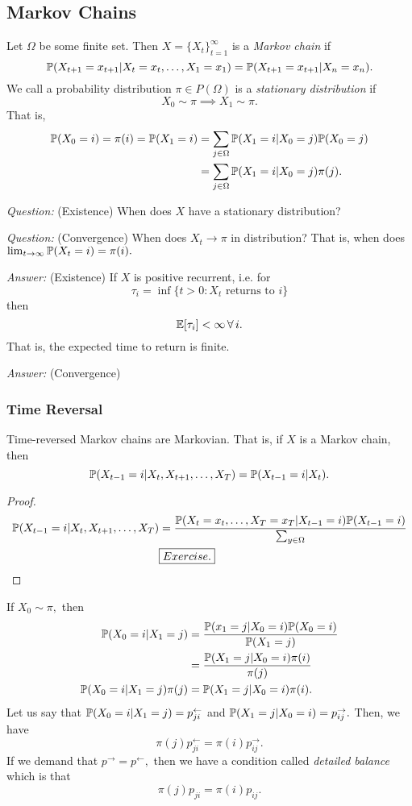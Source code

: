 \documentclass{chaistyle}
\begin{document}
\subsection*{Markov Chains}
Let \(\Omega\) be some finite set. Then \(X=\{X_t\}_{t=1}^\infty\) is a \emph{Markov chain} if  \[\P(X_{t+1}=x_{t+1}|X_t=x_t,\dots,X_1=x_1)=\P(X_{t+1}=x_{t+1}|X_n=x_n).\] We call a probability distribution \(\pi\in P(\Omega)\) is a \emph{stationary distribution} if \[X_0\sim\pi\implies X_1\sim\pi.\] That is, \begin{align*}
    \P(X_0=i)=\pi(i)=\P(X_1=i)&=\sum_{j\in\Omega} \P(X_1=i|X_0=j)\P(X_0=j) \\ 
    &= \sum_{j\in\Omega} \P(X_1=i|X_0=j)\pi(j).
\end{align*}

\emph{Question:} (Existence) When does \(X\) have a stationary distribution?

\emph{Question:} (Convergence) When does \(X_t\to\pi\) in distribution? That is, when does \(\lim_{t \to \infty} \P(X_t=i)=\pi(i).\)

\emph{Answer:} (Existence) If \(X\) is positive recurrent, i.e. for \[\tau_i=\inf\{t>0:X_t\text{ returns to }i\}\] then \[\E[\tau_i]<\infty\,\fa i.\] That is, the expected time to return is finite.

\emph{Answer:} (Convergence) 
\subsubsection*{Time Reversal}
\begin{proposition*}
    Time-reversed Markov chains are Markovian. That is, if \(X\) is a Markov chain, then \[\P(X_{t-1}=i|X_t,X_{t+1},\dots,X_T)=\P(X_{t-1}=i|X_t).\]
\end{proposition*}
\begin{proof}
    \begin{align*}
        \P(X_{t-1}=i|X_t,X_{t+1},\dots,X_T) &= \frac{\P(X_t=x_t,\dots,X_T=x_T|X_{t-1}=i)\P(X_{t-1}=i)}{\sum_{y\in\Omega}} \\
        &\boxed{Exercise.}
    \end{align*}
\end{proof}
If \(X_0\sim\pi,\) then \begin{align*}
    \P(X_0=i|X_1=j) &= \frac{\P(x_1=j|X_0=i)\P(X_0=i)}{\P(X_1=j)} \\ 
    &= \frac{\P(X_1=j|X_0=i)\pi(i)}{\pi(j)} \\ 
    \P(X_0=i|X_1=j)\pi(j) &= \P(X_1=j|X_0=i)\pi(i).
\end{align*}
Let us say that \(\P(X_0=i|X_1=j)=p^\leftarrow_{ji}\) and \(\P(X_1=j|X_0=i)=p^\rightarrow_{ij}.\) Then, we have \[\pi(j)p^\leftarrow_{ji}=\pi(i)p^\rightarrow_{ij}.\] If we demand that \(p^\rightarrow = p^\leftarrow,\) then we have a condition called \emph{detailed balance} which is that \[\pi(j)p_{ji}=\pi(i)p_{ij}.\]
\end{document}
